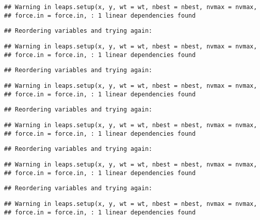 \documentclass[]{article}
\begin{document}
\begin{verbatim}
## Warning in leaps.setup(x, y, wt = wt, nbest = nbest, nvmax = nvmax,
## force.in = force.in, : 1 linear dependencies found
\end{verbatim}

\begin{verbatim}
## Reordering variables and trying again:
\end{verbatim}

\begin{verbatim}
## Warning in leaps.setup(x, y, wt = wt, nbest = nbest, nvmax = nvmax,
## force.in = force.in, : 1 linear dependencies found
\end{verbatim}

\begin{verbatim}
## Reordering variables and trying again:
\end{verbatim}

\begin{verbatim}
## Warning in leaps.setup(x, y, wt = wt, nbest = nbest, nvmax = nvmax,
## force.in = force.in, : 1 linear dependencies found
\end{verbatim}

\begin{verbatim}
## Reordering variables and trying again:
\end{verbatim}

\begin{verbatim}
## Warning in leaps.setup(x, y, wt = wt, nbest = nbest, nvmax = nvmax,
## force.in = force.in, : 1 linear dependencies found
\end{verbatim}

\begin{verbatim}
## Reordering variables and trying again:
\end{verbatim}

\begin{verbatim}
## Warning in leaps.setup(x, y, wt = wt, nbest = nbest, nvmax = nvmax,
## force.in = force.in, : 1 linear dependencies found
\end{verbatim}

\begin{verbatim}
## Reordering variables and trying again:
\end{verbatim}

\begin{verbatim}
## Warning in leaps.setup(x, y, wt = wt, nbest = nbest, nvmax = nvmax,
## force.in = force.in, : 1 linear dependencies found
\end{verbatim}
\end{document}
